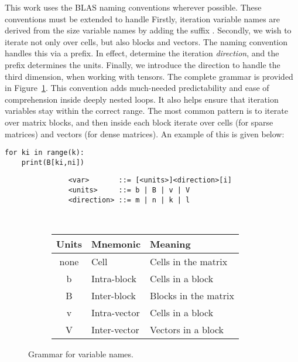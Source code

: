 This work uses the BLAS naming conventions wherever possible. These conventions must be extended to handle 
Firstly, iteration variable names are derived from the size variable names by adding the suffix . Secondly, we wish to iterate not only over cells, but also blocks and vectors. The naming convention handles this via a prefix. In effect,  determine the iteration \emph{direction}, and the prefix determines the units. Finally, we introduce the direction  to handle the third dimension, when working with tensors. The complete grammar is provided in Figure~\ref{fig:grammar}. This convention adds much-needed predictability and ease of comprehension inside deeply nested loops. It also helps ensure that iteration variables stay within the correct range. The most common pattern is to iterate over matrix blocks, and then inside each block iterate over cells (for sparse matrices) and vectors (for dense matrices). An example of this is given below:

\begin{verbatim}
for ki in range(k):
	print(B[ki,ni])
\end{verbatim}

\begin{figure}[tbh]
  \centering
  \begin{subfigure}[l]{0.48\textwidth}
      \begin{verbatim}
    <var>       ::= [<units>]<direction>[i]
    <units>     ::= b | B | v | V
    <direction> ::= m | n | k | l
  \end{verbatim}
  \end{subfigure}
  ~~~~
  \begin{subfigure}[r]{0.45\textwidth}
    \centering
    \begin{tabular}{cll}
		\toprule
		Units    & Mnemonic & Meaning \\
		\midrule

		none  & Cell          & Cells in the matrix      \\
		b     & Intra-block   & Cells in a block         \\
		B     & Inter-block   & Blocks in the matrix     \\
		v     & Intra-vector  & Cells in a block         \\
		V     & Inter-vector  & Vectors in a block       \\
		\bottomrule
	\end{tabular}
  \end{subfigure}
  \caption{Grammar for variable names.}
  \label{fig:grammar}
\end{figure}


